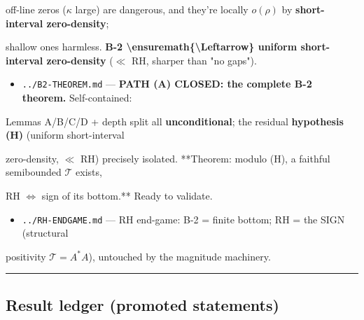 \documentclass[10pt]{article}
\begin{document}
  off-line zeros ($\kappa$ large) are dangerous, and they're locally $o(\rho)$ by \textbf{short-interval zero-density};\par
  shallow ones harmless. \textbf{B-2 \textbackslash{}ensuremath\{\textbackslash{}Leftarrow\} uniform short-interval zero-density} (\ensuremath{\ll} RH, sharper than "no gaps").\par
\begin{itemize}
\item \texttt{../B2-THEOREM.md} --- \textbf{PATH (A) CLOSED: the complete B-2 theorem.} Self-contained:
\end{itemize}
  Lemmas A/B/C/D + depth split all \textbf{unconditional}; the residual \textbf{hypothesis (H)} (uniform short-interval\par
  zero-density, \ensuremath{\ll} RH) precisely isolated. **Theorem: modulo (H), a faithful semibounded $\mathcal T$ exists,\par
  RH \ensuremath{\iff} sign of its bottom.** Ready to validate.\par
\begin{itemize}
\item \texttt{../RH-ENDGAME.md} --- RH end-game: B-2 = finite bottom; RH = the SIGN (structural
\end{itemize}
  positivity $\mathcal T=A^*A$), untouched by the magnitude machinery.\par

\medskip\hrule\medskip

\subsection*{Result ledger (promoted statements)}
\end{document}

